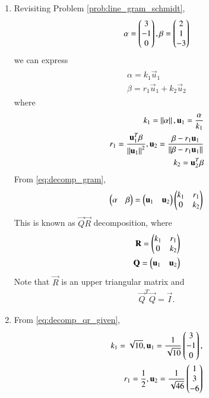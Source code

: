 \renewcommand{\theequation}{\theenumi}
\begin{enumerate}[label=\thesubsection.\arabic*.,ref=\thesubsection.\theenumi]

\item Revisiting Problem \eqref{prob:line_gram_schmidt},
%
\begin{align}
\label{eq:decomp_qr_given}
{\alpha} = \begin{pmatrix}3\\-1\\0\end{pmatrix},
 {\beta} = \begin{pmatrix}2\\1\\-3\end{pmatrix}
\end{align}
%
we can express
\begin{align}
\begin{split}
\alpha = k_1\vec{u}_1 
\\
\beta = r_1\vec{u}_1 +k_2\vec{u}_2
\end{split}
\label{eq:decomp_gram}
\end{align}
%
where 
\begin{align}
k_1 = \left\lVert\alpha\right\rVert, \mathbf{u}_1 = \frac{\mathbf{\alpha}}{k_1} 
\\
r_1 = \frac{\mathbf{u}_1^T\beta}{\left\lVert\mathbf{u}_1\right\rVert^2}, 
\mathbf{u}_2 = \frac{\beta - r_1 \mathbf{u}_1}{\left\lVert\beta - r_1 \mathbf{u}_1\right\rVert}
\\
k_2 = {\mathbf{u}_2^T\beta}
\end{align}
From \eqref{eq:decomp_gram}, 
\begin{align}
\begin{pmatrix}\alpha & \beta \end{pmatrix} = \begin{pmatrix}\mathbf{u}_1 & \mathbf{u}_2\end{pmatrix}\begin{pmatrix}k_1 & r_1 \\ 0 & k_2\end{pmatrix} 
\end{align}
%
This is known as $\vec{Q}\vec{R}$ decomposition, where 
\begin{align}
\mathbf{R} = \begin{pmatrix}k_1 & r_1 \\ 0 & k_2\end{pmatrix} 
\\
\mathbf{Q} = \begin{pmatrix}\mathbf{u}_1 & \mathbf{u}_2\end{pmatrix}
\end{align}
%
Note that $\vec{R}$ is an upper triangular matrix and 
\begin{align}
\vec{Q}^T\vec{Q} = \vec{I}.
\end{align}
\item From \eqref{eq:decomp_qr_given},
\begin{align}
k_1 = \sqrt{10}, \vec{u}_1 = \frac{1}{\sqrt{10}} \myvec{3\\-1\\0},
\\
r_1 = \frac{1}{2}, \vec{u}_2 = \frac{1}{\sqrt{46}}\myvec{1\\3\\-6}

\end{align}
\end{enumerate}
